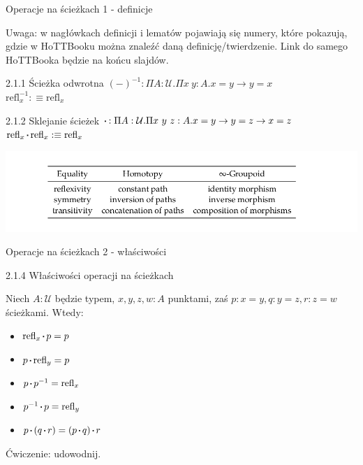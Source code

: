 \documentclass{beamer}
\newcommand{\defn}{:\equiv}
\newcommand{\U}{\mathcal{U}}
\newcommand{\refl}[1]{\text{refl}_{#1}}
\newcommand{\inv}[1]{#1^{-1}}
\newcommand{\sq}{\mathbin{\vcenter{\hbox{\rule{.3ex}{.3ex}}}}}
\begin{document}
\begin{frame}{Operacje na ścieżkach 1 - definicje}

Uwaga: w nagłówkach definicji i lematów pojawiają się numery, które pokazują, gdzie w HoTTBooku można znaleźć daną definicję/twierdzenie. Link do samego HoTTBooka będzie na końcu slajdów.

\begin{block}{2.1.1 Ścieżka odwrotna}
$\inv{(-)} : \Pi A : \U. \Pi x\ y : A. x = y \to y = x$ \\
$\inv{\refl{x}} \defn \refl{x}$
\end{block}

\begin{block}{2.1.2 Sklejanie ścieżek}
$\sq : \Pi A : \U. \Pi x\ y\ z : A. x = y \to y = z \to x = z$ \\
$\refl{x} \sq \refl{x} \defn \refl{x}$
\end{block}

\includegraphics[scale=0.3]{EqPathGrupoid.png}

\end{frame}

\begin{frame}{Operacje na ścieżkach 2 - właściwości}

\begin{block}{2.1.4 Właściwości operacji na ścieżkach}

Niech $A : \U$ będzie typem, $x, y, z, w : A$ punktami, zaś $p : x = y, q : y = z, r : z = w$ ścieżkami. Wtedy:

\begin{itemize}
	\item $\refl{x} \sq p = p$
	\item $p \sq \refl{y} = p$
	\item $p \sq \inv{p} = \refl{x}$
	\item $\inv{p} \sq p = \refl{y}$
	\item $p \sq (q \sq r) = (p \sq q) \sq r$
\end{itemize}

\end{block}

Ćwiczenie: udowodnij.

\end{frame}
\end{document}
